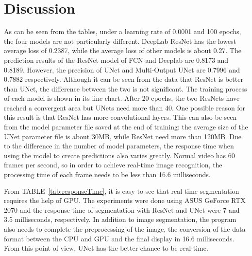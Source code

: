\documentclass[10pt,journal,compsoc]{IEEEtran}
\begin{document}
\section{Discussion}
As can be seen from the tables, under a learning rate of 0.0001 and 100 epochs, the four models are not particularly different.
DeepLab ResNet has the lowest average loss of 0.2387, while the average loss of other models is about 0.27.
The prediction results of the ResNet model of FCN and Deeplab are 0.8173 and 0.8189. 
However, the precision of UNet and Multi-Output UNet are 0.7996 and 0.7882 \linebreak respectively.
Although it can be seen from the data that ResNet is better than UNet, the difference between the two is not significant.
The training process of each model is shown in its line chart.
After 20 epochs, the two ResNets have reached a convergent area but UNets need more than 40.
One possible reason for this result is that ResNet has more convolutional layers. 
This can also be seen from the model parameter file saved at the end of training: the average size of the UNet parameter file is about 30MB, while ResNet need more than 120MB.
Due to the difference in the number of model parameters, the response time when using the model to create predictions also varies greatly.
Normal video has 60 frames per second, so in order to achieve \linebreak real-time image recognition, the processing time of each frame needs to be less than 16.6 milliseconds.
\par
From TABLE~\ref{tab:responseTime}, it is easy to see that real-time \linebreak segmentation requires the help of GPU.
The \linebreak experiments were done using ASUS GeForce RTX 2070 and the response time of segmentation with ResNet and UNet were 7 and 3.5 milliseconds, respectively.
In addition to image segmentation, the program also needs to complete the preprocessing of the image, the conversion of the data format between the CPU and GPU and the final display in 16.6 milliseconds.
From this point of view, UNet has the better chance to be real-time.


%
%
\end{document}
